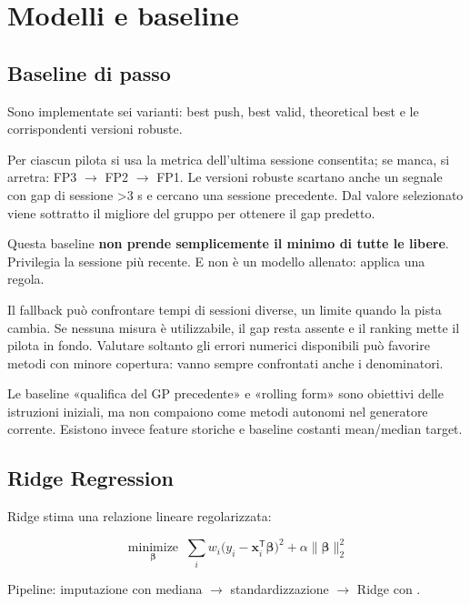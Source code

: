 \documentclass[11pt,a4paper]{article}
\newcommand{\code}[1]{{\ttfamily\small\seqsplit{#1}}}
\begin{document}
\section{Modelli e baseline}\label{modelli-e-baseline}

\subsection{Baseline di passo}\label{baseline-di-passo}

Sono implementate sei varianti: best push, best valid, theoretical best e le corrispondenti versioni robuste.

Per ciascun pilota si usa la metrica dell'ultima sessione consentita; se manca, si arretra: FP3 \ensuremath{\rightarrow} FP2 \ensuremath{\rightarrow} FP1. Le versioni robuste scartano anche un segnale con gap di sessione \textgreater3 s e cercano una sessione precedente. Dal valore selezionato viene sottratto il migliore del gruppo per ottenere il gap predetto.

Questa baseline \textbf{non prende semplicemente il minimo di tutte le libere}. Privilegia la sessione più recente. E non è un modello allenato: applica una regola.

Il fallback può confrontare tempi di sessioni diverse, un limite quando la pista cambia. Se nessuna misura è utilizzabile, il gap resta assente e il ranking mette il pilota in fondo. Valutare soltanto gli errori numerici disponibili può favorire metodi con minore copertura: vanno sempre confrontati anche i denominatori.

Le baseline «qualifica del GP precedente» e «rolling form» sono obiettivi delle istruzioni iniziali, ma non compaiono come metodi autonomi nel generatore corrente. Esistono invece feature storiche e baseline costanti mean/median target.

\subsection{Ridge Regression}\label{ridge-regression}

Ridge stima una relazione lineare regolarizzata:

\[\underset{\boldsymbol{\beta}}{\operatorname{minimize}}\;\sum_i w_i\bigl(y_i-\mathbf{x}_i^{\mathsf{T}}\boldsymbol{\beta}\bigr)^2+\alpha\lVert\boldsymbol{\beta}\rVert_2^2\]

Pipeline: imputazione con mediana \ensuremath{\rightarrow} standardizzazione \ensuremath{\rightarrow} Ridge con \code{alpha=1}.
\end{document}
